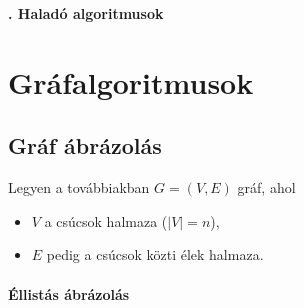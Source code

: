 \documentclass[margin=0px]{article}
\date{}
\begin{document}
    \begin{center}
        {\Large\bfseries{}. Haladó algoritmusok} \\
    \end{center}

	\section*{Gráfalgoritmusok}
	
    \subsection*{Gráf ábrázolás}

    Legyen a továbbiakban $G = (V, E)$ gráf, ahol
    \begin{itemize}
        \item $V$ a csúcsok halmaza ($|V| = n$),
        \item $E$ pedig a csúcsok közti élek halmaza.
    \end{itemize}

	\paragraph*{Éllistás ábrázolás\\\\}
\end{document}
